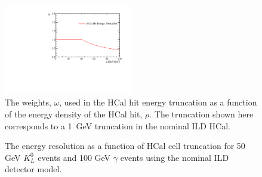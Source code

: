 \begin{figure}[h!]
\includegraphics[width=0.5\textwidth]{EnergyEstimators/Plots/SoftComp/Weights/CellTruncWeights.pdf}
\caption[The weights, $\omega$, used in the HCal hit energy truncation as a function of the energy density of the HCal hit, $\rho$.  The truncation shown here corresponds to a 1~GeV truncation in the nominal ILD HCal.]{The weights, $\omega$, used in the HCal hit energy truncation as a function of the energy density of the HCal hit, $\rho$.  The truncation shown here corresponds to a 1~GeV truncation in the nominal ILD HCal.}
\label{fig:hcalcellweight}
\end{figure}

\begin{figure}[h!]
\caption[The energy resolution as a function of HCal cell truncation for \protect{} 50 GeV $K^{0}_{L}$ events and \protect{} 100 GeV $\gamma$ events using the nominal ILD detector model.]{The energy resolution as a function of HCal cell truncation for \protect{} 50 GeV $K^{0}_{L}$ events and \protect{} 100 GeV $\gamma$ events using the nominal ILD detector model.}
\label{fig:ercelltrunc}
\end{figure}

